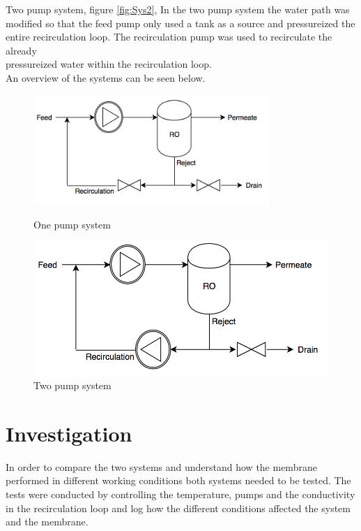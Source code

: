 Two pump system, figure \ref{fig:Sys2}, In the two pump system the water path was modified so that the feed pump only used a tank as a source and pressureized the entire recirculation loop. The recirculation pump was used to recirculate the already\\ pressureized water within the recirculation loop.\\


An overview of the systems can be seen below.\\
\begin{figure}[h]
\centering
\begin{minipage}{.5\textwidth}
    \centering
    \includegraphics[width=0.8\textwidth]{Sys1}
    \caption{One pump system}
    \label{fig:System1}
\end{minipage}%
\begin{minipage}{.5\textwidth}
  \centering
  \includegraphics[width=.8\linewidth]{Sys2}
  \caption{Two pump system}
  \label{fig:System2}
\end{minipage}
\end{figure}

\newpage

\section{Investigation}

In order to compare the two systems and understand how the membrane performed in different working conditions both systems needed to be tested. The tests were conducted by controlling the temperature, pumps and the conductivity in the recirculation loop and log how the different conditions affected the system and the membrane. 

